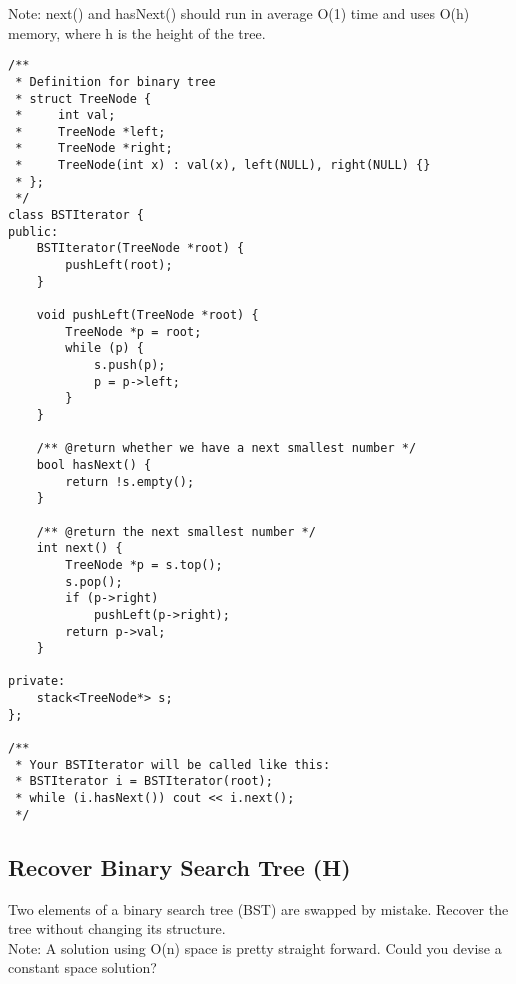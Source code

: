 Note: next() and hasNext() should run in average O(1) time and uses O(h) memory, where h is the height of the tree. \\

\begin{lstlisting}
/**
 * Definition for binary tree
 * struct TreeNode {
 *     int val;
 *     TreeNode *left;
 *     TreeNode *right;
 *     TreeNode(int x) : val(x), left(NULL), right(NULL) {}
 * };
 */
class BSTIterator {
public:
    BSTIterator(TreeNode *root) {
        pushLeft(root);
    }
    
    void pushLeft(TreeNode *root) {
        TreeNode *p = root;
        while (p) {
            s.push(p);
            p = p->left;
        }
    }

    /** @return whether we have a next smallest number */
    bool hasNext() {
        return !s.empty();
    }

    /** @return the next smallest number */
    int next() {
        TreeNode *p = s.top();
        s.pop();
        if (p->right)
            pushLeft(p->right);
        return p->val;
    }
    
private:
    stack<TreeNode*> s;
};

/**
 * Your BSTIterator will be called like this:
 * BSTIterator i = BSTIterator(root);
 * while (i.hasNext()) cout << i.next();
 */
\end{lstlisting}


\subsection{Recover Binary Search Tree (H)}
Two elements of a binary search tree (BST) are swapped by mistake. Recover the tree without changing its structure.\\

Note: A solution using O(n) space is pretty straight forward. Could you devise a constant space solution? \\

